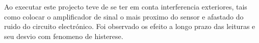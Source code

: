 \begin{columns}
{{\begin{minipage}[b!]{\linewidth}
\begin{minipage}[b!]{.2\linewidth}
			\end{minipage}
			\begin{minipage}[b!]{.6\linewidth}
				Ao executar este projecto teve de se ter em conta interferencia exteriores, tais como colocar o amplificador de sinal o mais proximo do sensor e afastado do ruido do circuito electrónico. Foi observado os efeito a longo prazo das leituras e seu desvio com fenomeno de histerese.
				\vspace{1cm}
			\end{minipage}
		\end{minipage}
	}
	\vspace{5cm}
}
\end{columns}

